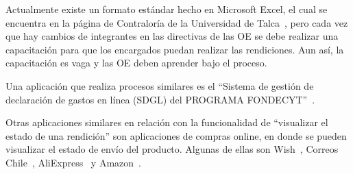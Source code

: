 Actualmente existe un formato estándar hecho en Microsoft Excel, el cual se encuentra en la página de Contraloría de la Universidad de Talca~\cite{6}, pero cada vez que hay cambios de integrantes en las directivas de las OE se debe realizar una capacitación para que los encargados puedan realizar las rendiciones. Aun así, la capacitación es vaga y las OE deben aprender bajo el proceso.

Una aplicación que realiza procesos similares es el ``Sistema de gestión de declaración de gastos en línea (SDGL) del PROGRAMA FONDECYT''~\cite{9}.

Otras aplicaciones similares en relación con la funcionalidad de ``visualizar el estado de una rendición'' son aplicaciones de compras online, en donde se pueden visualizar el estado de envío del producto. Algunas de ellas son Wish~\cite{10}, Correos Chile~\cite{11}, AliExpress~\cite{12} y  Amazon~\cite{13}.
